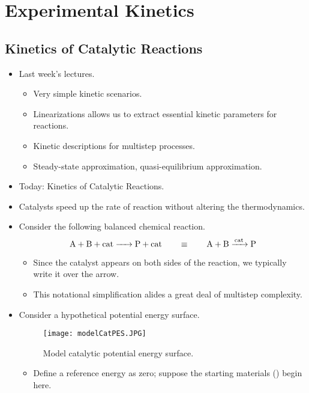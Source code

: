 \documentclass[../notes.tex]{subfiles}
\begin{document}
\chapter{Experimental Kinetics}
\section{Kinetics of Catalytic Reactions}
\begin{itemize}
    \item {}Last week's lectures.
    \begin{itemize}
        \item Very simple kinetic scenarios.
        \item Linearizations allows us to extract essential kinetic parameters for reactions.
        \item Kinetic descriptions for multistep processes.
        \item Steady-state approximation, quasi-equilibrium approximation.
    \end{itemize}
    \item Today: Kinetics of Catalytic Reactions.
    \item Catalysts speed up the rate of reaction without altering the thermodynamics.
    \item Consider the following balanced chemical reaction.
    \begin{equation*}
        \ce{A + B + cat -> P + cat}
        \qquad\equiv\qquad
        \ce{A + B ->[cat] P}
    \end{equation*}
    \begin{itemize}
        \item Since the catalyst appears on both sides of the reaction, we typically write it over the arrow.
        \item This notational simplification alides a great deal of multistep complexity.
    \end{itemize}
    \item Consider a hypothetical potential energy surface.
    \begin{figure}[h!]
        \centering
        \texttt{[image: modelCatPES.JPG]}
        \caption{Model catalytic potential energy surface.}
        \label{fig:modelCatPES}
    \end{figure}
    \begin{itemize}
        \item Define a reference energy as zero; suppose the starting materials () begin here.

\end{itemize}
\end{itemize}
\end{document}
